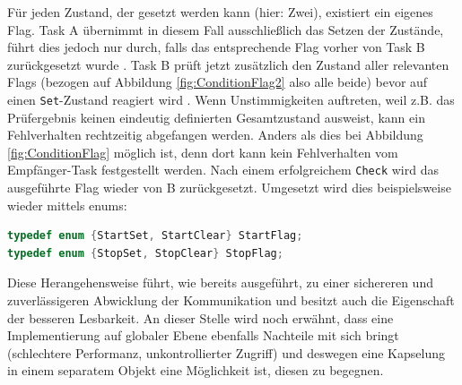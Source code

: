 \documentclass{llncs}
\begin{document}
Für jeden Zustand, der gesetzt werden kann (hier: Zwei), existiert ein eigenes Flag. Task A übernimmt in diesem Fall ausschließlich das Setzen der Zustände, führt dies jedoch nur durch, falls das entsprechende Flag vorher von Task B zurückgesetzt wurde \autocite[vgl.][85]{Cooling2017}. Task B prüft jetzt zusätzlich den Zustand aller relevanten Flags (bezogen auf Abbildung \ref{fig:ConditionFlag2} also alle beide) bevor auf einen \texttt{Set}-Zustand reagiert wird \autocite[vgl.][85]{Cooling2017}. Wenn Unstimmigkeiten auftreten, weil z.B. das Prüfergebnis keinen eindeutig definierten Gesamtzustand ausweist, kann ein Fehlverhalten rechtzeitig abgefangen werden. Anders als dies bei Abbildung \ref{fig:ConditionFlag} möglich ist, denn dort kann kein Fehlverhalten vom Empfänger-Task festgestellt werden. Nach einem erfolgreichem \texttt{Check} wird das ausgeführte Flag wieder von B zurückgesetzt. Umgesetzt wird dies beispielsweise wieder mittels enums:
\begin{lstlisting}[language=C]
typedef enum {StartSet, StartClear} StartFlag;
typedef enum {StopSet, StopClear} StopFlag;
\end{lstlisting}
Diese Herangehensweise führt, wie bereits ausgeführt, zu einer sichereren und zuverlässigeren Abwicklung der Kommunikation und besitzt auch die Eigenschaft der besseren Lesbarkeit. An dieser Stelle wird noch erwähnt, dass eine Implementierung auf globaler Ebene ebenfalls Nachteile mit sich bringt (schlechtere Performanz, unkontrollierter Zugriff) und deswegen eine Kapselung in einem separatem Objekt eine Möglichkeit ist, diesen zu begegnen.\\
\end{document}
